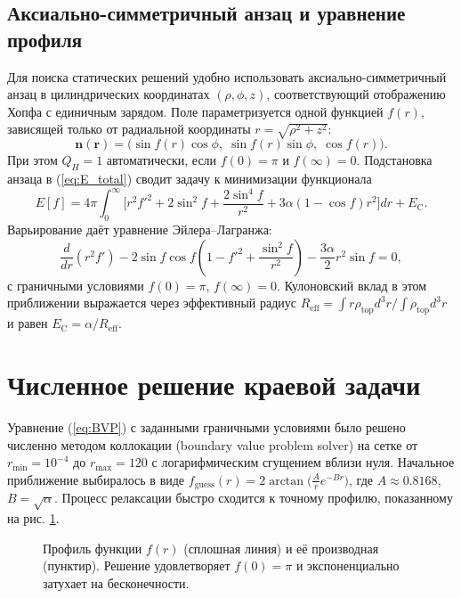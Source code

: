 \documentclass[12pt]{article}
\begin{document}
\subsection{Аксиально-симметричный анзац и уравнение профиля}

Для поиска статических решений удобно использовать аксиально-симметричный анзац в цилиндрических координатах $(\rho,\phi,z)$, соответствующий отображению Хопфа с единичным зарядом. Поле параметризуется одной функцией $f(r)$, зависящей только от радиальной координаты $r = \sqrt{\rho^2+z^2}$:
\begin{equation}
\mathbf{n}(\mathbf{r}) = \big( \sin f(r) \cos\phi,\; \sin f(r) \sin\phi,\; \cos f(r) \big).
\end{equation}
При этом $Q_H=1$ автоматически, если $f(0)=\pi$ и $f(\infty)=0$. Подстановка анзаца в (\ref{eq:E_total}) сводит задачу к минимизации функционала
\begin{equation}
E[f] = 4\pi \int_0^\infty \Big[ r^2 f'^2 + 2\sin^2 f + \frac{2\sin^4 f}{r^2} + 3\alpha (1-\cos f) r^2 \Big] dr + E_{\text{C}}.
\label{eq:E_radial}
\end{equation}
Варьирование даёт уравнение Эйлера--Лагранжа:
\begin{equation}
\frac{d}{dr}\left( r^2 f' \right) - 2\sin f\cos f\left(1 - f'^2 + \frac{\sin^2 f}{r^2}\right) - \frac{3\alpha}{2} r^2 \sin f = 0,
\label{eq:BVP}
\end{equation}
с граничными условиями $f(0)=\pi$, $f(\infty)=0$. Кулоновский вклад в этом приближении выражается через эффективный радиус $R_{\text{eff}} = \int r \rho_{\text{top}} d^3r / \int \rho_{\text{top}} d^3r$ и равен $E_{\text{C}} = \alpha/R_{\text{eff}}$.

\section{Численное решение краевой задачи}
\label{sec:bvp}

Уравнение (\ref{eq:BVP}) с заданными граничными условиями было решено численно методом коллокации (boundary value problem solver) на сетке от $r_{\min}=10^{-4}$ до $r_{\max}=120$ с логарифмическим сгущением вблизи нуля. Начальное приближение выбиралось в виде $f_{\text{guess}}(r) = 2\arctan\big( \frac{A}{r} e^{-B r} \big)$, где $A\approx0.8168$, $B=\sqrt{\alpha}$. Процесс релаксации быстро сходится к точному профилю, показанному на рис. \ref{fig:profile}.

\begin{figure}[h]
\centering
\caption{Профиль функции $f(r)$ (сплошная линия) и её производная (пунктир). Решение удовлетворяет $f(0)=\pi$ и экспоненциально затухает на бесконечности.}
\label{fig:profile}
\end{figure}
\end{document}
